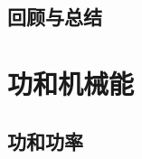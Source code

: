\documentclass[color=purple,openany]{textbook-cn}
\begin{document}
\begin{Case}
\item \lipsum[1][3]
\item \lipsum[1][3]
\item \lipsum[1][3]
\item \lipsum[1][3]
\end{Case}

\begin{Link}
\zhlipsum[1]
\end{Link}





\section{回顾与总结}

\begin{Point}
\lipsum[2]
\end{Point}

\begin{Case*}
\item \lipsum[1][3]
\item \lipsum[1][3]
\item \lipsum[1][3]
\item \lipsum[1][3]
\end{Case*}

\begin{Link}
\zhlipsum[1]
\end{Link}






\chaptersaying{\lipsum[1][8]}
\chapter{功和机械能}


\begin{Block}[章节引入]
\lipsum[1-3]
\end{Block}

\section{功和功率}

\begin{Point}
\lipsum[2]
\end{Point}

\begin{Case}
\item \lipsum[1][3]
\item \lipsum[1][3]
\item \lipsum[1][3]
\item \lipsum[1][3]
\end{Case}
\end{document}

